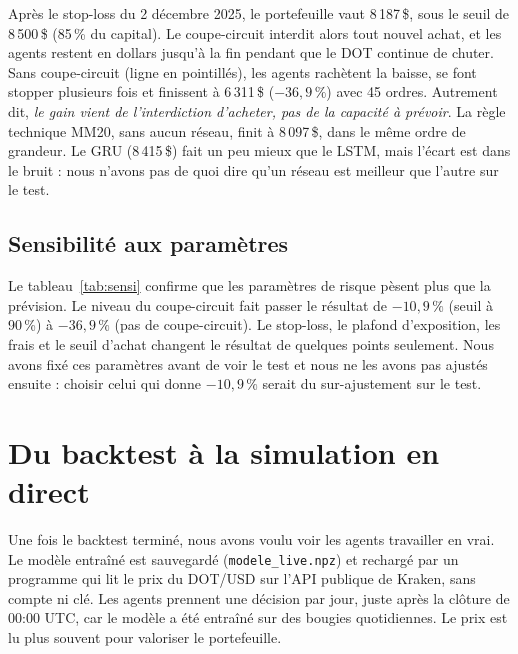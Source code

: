 \documentclass[11pt,a4paper]{article}
\newcommand{\dollar}{\,\$}
\begin{document}
\begin{table}[H]\centering\small

\caption{Les 16 ordres du LSTM.}
\end{table}

Après le stop-loss du 2 décembre 2025, le portefeuille vaut 8\,187\dollar{}, sous le seuil de 8\,500\dollar{} (85\,\% du capital). Le coupe-circuit interdit alors
tout nouvel achat, et les agents restent en dollars jusqu'à la fin pendant que le DOT continue de chuter. Sans coupe-circuit (ligne en pointillés),
les agents rachètent la baisse, se font stopper plusieurs fois et finissent à 6\,311\dollar{} ($-36{,}9\,\%$) avec 45 ordres. Autrement dit, \emph{le gain
vient de l'interdiction d'acheter, pas de la capacité à prévoir}. La règle technique MM20, sans aucun réseau, finit à 8\,097\dollar{}, dans le même ordre
de grandeur. Le GRU (8\,415\dollar{}) fait un peu mieux que le LSTM, mais l'écart est dans le bruit : nous n'avons pas de quoi dire qu'un réseau est
meilleur que l'autre sur le test.

\subsection{Sensibilité aux paramètres}

\begin{table}[H]\centering\small

\caption{Un paramètre change à la fois, les autres restent à leur valeur de référence.}\label{tab:sensi}
\end{table}

Le tableau~\ref{tab:sensi} confirme que les paramètres de risque pèsent plus que la prévision. Le niveau du coupe-circuit fait passer le résultat de
$-10{,}9\,\%$ (seuil à 90\,\%) à $-36{,}9\,\%$ (pas de coupe-circuit). Le stop-loss, le plafond d'exposition, les frais et le seuil d'achat changent le
résultat de quelques points seulement. Nous avons fixé ces paramètres avant de voir le test et nous ne les avons pas ajustés ensuite : choisir celui qui donne
$-10{,}9\,\%$ serait du sur-ajustement sur le test.

\section{Du backtest à la simulation en direct}\label{sec:direct}

Une fois le backtest terminé, nous avons voulu voir les agents travailler en vrai. Le modèle entraîné est sauvegardé (\texttt{modele\_live.npz}) et rechargé
par un programme qui lit le prix du DOT/USD sur l'API publique de Kraken, sans compte ni clé. Les agents prennent une décision par jour, juste après la
clôture de 00:00 UTC, car le modèle a été entraîné sur des bougies quotidiennes. Le prix est lu plus souvent pour valoriser le portefeuille.
\end{document}
